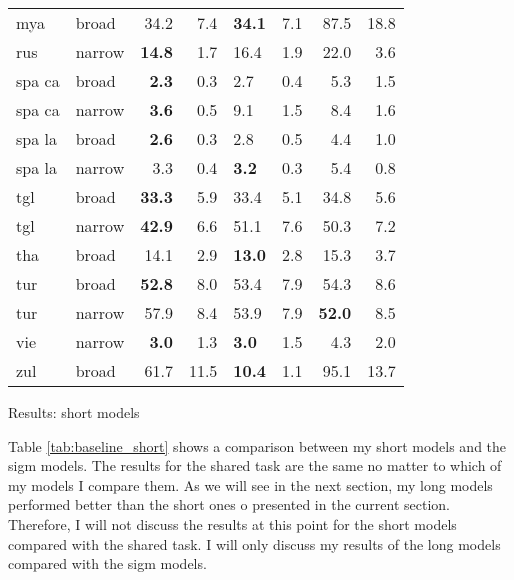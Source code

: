 {\begin{tabularx}{1.1\textwidth}{|l|X||r|r||X|X||r|r|}
mya    & broad  & 34.2 & 7.4  & \textbf{34.1} & 7.1  & 87.5 & 18.8 \\
rus    & narrow & \textbf{14.8} & 1.7  & 16.4 & 1.9  & 22.0 & 3.6  \\
spa ca & broad  & \textbf{2.3}  & 0.3  & 2.7  & 0.4  & 5.3  & 1.5  \\
spa ca & narrow & \textbf{3.6}  & 0.5  & 9.1  & 1.5  & 8.4  & 1.6  \\
spa la & broad  & \textbf{2.6}  & 0.3  & 2.8  & 0.5  & 4.4  & 1.0  \\
spa la & narrow & 3.3  & 0.4  & \textbf{3.2}  & 0.3  & 5.4  & 0.8  \\
tgl    & broad  & \textbf{33.3} & 5.9  & 33.4 & 5.1  & 34.8 & 5.6  \\
tgl    & narrow & \textbf{42.9} & 6.6  & 51.1 & 7.6  & 50.3 & 7.2  \\
tha    & broad  & 14.1 & 2.9  & \textbf{13.0} & 2.8  & 15.3 & 3.7  \\
tur    & broad  & \textbf{52.8} & 8.0  & 53.4 & 7.9  & 54.3 & 8.6  \\
tur    & narrow & 57.9 & 8.4  & 53.9 & 7.9  & \textbf{52.0} & 8.5  \\
vie    & narrow & \textbf{3.0}  & 1.3  & \textbf{3.0}  & 1.5  & 4.3  & 2.0  \\
zul    & broad  & 61.7 & 11.5 & \textbf{10.4} & 1.1  & 95.1 & 13.7 \\ \hline
\end{tabularx}
}{Results: short models}

Table \ref{tab:baseline_short} shows a comparison between my short models and the \ac{sigm} models. The results for the shared task are the same no matter to which of my models I compare them. As we will see in the next section, my long models performed better than the short ones o presented in the current section. Therefore, I will not discuss the results at this point for the short models compared with the shared task. I will only discuss my results of the long models compared with the \ac{sigm} models.

